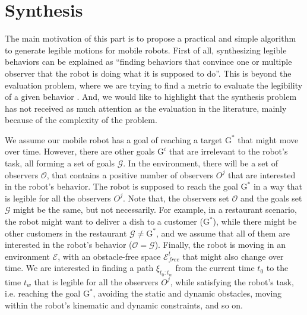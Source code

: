
\section{Synthesis}

The main motivation of this part is to propose a practical and simple algorithm to generate legible motions for mobile robots.
First of all, synthesizing legible behaviors can be explained as ``finding behaviors that convince one or multiple observer that the robot is doing what it is supposed to do''.
This is beyond the evaluation problem, where we are trying to find a metric to evaluate the legibility of a given behavior \cite{dragan2013generating}.
And, we would like to highlight that the synthesis problem has not received as much attention as the evaluation in the literature,
mainly because of the complexity of the problem.
%



\vspace{0.3cm}
We assume our mobile robot has a goal of reaching a target $\mathrm{G}^*$ that might move over time.
However, there are other goals $\mathrm{G}^i$ that are irrelevant to the robot's task, all forming a set of goals $\mathcal{G}$.
In the environment, there will be a set of observers $\mathcal{O}$, that contains a positive number of observers $O^j$ that are interested in the robot's behavior.
The robot is supposed to reach the goal $\mathrm{G}^*$ in a way that is legible for all the observers $O^j$.
Note that, the observers set $\mathcal{O}$ and the goals set $\mathcal{G}$ might be the same, but not necessarily.
For example, in a restaurant scenario, the robot might want to deliver a dish to a customer ($\mathrm{G}^*$),
while there might be other customers in the restaurant $\mathcal{G} \neq \mathrm{G}^*$,
and we assume that all of them are interested in the robot's behavior ($\mathcal{O} = \mathcal{G}$).
%
Finally, the robot is moving in an environment $\mathcal{E}$, with an obstacle-free space $\mathcal{E}_{free}^t$ that might also change over time.
We are interested in finding a path $\xi_{t_0:t_w}$ from the current time $t_0$ to the time $t_w$ that is legible for all the observers $O^j$,
while satisfying the robot's task, i.e. reaching the goal $\mathrm{G}^*$, avoiding the static and dynamic obstacles,
moving within the robot's kinematic and dynamic constraints, and so on.


